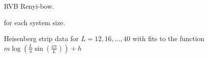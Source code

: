 \documentclass[prl,aps,twocolumn,floatfix,amsmath,amssymb,superscriptaddress,tightenlines]{revtex4}
\begin{document}
 \begin{figure}[ht]
   \begin{center}
   \end{center}
   \caption{RVB Renyi-bow. }
   \label{fig:2}
 \end{figure}

 \begin{figure}[ht]
   \begin{center}
   \end{center}
   \caption{Heisenberg strip data for $L=12,16,\dots,40$ with fits to the function $m\log(\tfrac{L}{\pi}\sin(\tfrac{x\pi}{L}))+h$} for each system size.
   \label{fig:heis_bow}
 \end{figure}
\end{document}
